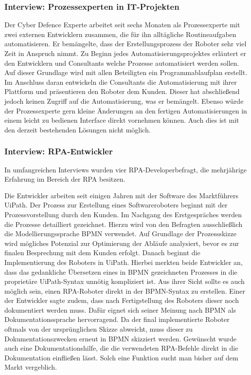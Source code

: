 \subsubsection{Interview: Prozessexperten in IT-Projekten}
Der Cyber Defence Experte arbeitet seit sechs Monaten als Prozessexperte mit zwei externen Entwicklern zusammen, die für ihn alltägliche Routineaufgaben automatisieren. Er bemängelte, dass der Erstellungsprozess der Roboter sehr viel Zeit in Anspruch nimmt. Zu Beginn jedes Automatisierungsprojektes erläutert er den Entwicklern und Consultants welche Prozesse automatisiert werden sollen. Auf dieser Grundlage wird mit allen Beteiligten ein Programmablaufplan erstellt. Im Anschluss daran entwickeln die Consultants die Automatisierung mit ihrer Plattform und präsentieren den Roboter dem Kunden. Dieser hat abschließend jedoch keinen Zugriff auf die Automatisierung, was er bemängelt. Ebenso würde der Prozessexperte gern kleine Änderungen an den fertigen Automatisierungen in einem leicht zu bedienen Interface direkt vornehmen können. Auch dies ist mit den derzeit bestehenden Lösungen nicht möglich.

\subsubsection{Interview: RPA-Entwickler}
In umfangreichen Interviews wurden vier RPA-Developerbefragt, die  mehrjährige Erfahrung im Bereich der RPA besitzen. 

Die Entwickler arbeiten seit einigen Jahren mit der Software des Marktführers UiPath. Der Prozess zur Erstellung eines Softwareroboters beginnt mit der Prozessvorstellung durch den Kunden. Im Nachgang des Erstgespräches werden die Prozesse detailliert gezeichnet. Hierzu wird von den Befragten ausschließlich die Modellierungssprache BPMN verwendet.  Auf Grundlage der Prozessskizze wird mögliches Potenzial zur Optimierung der Abläufe analysiert, bevor es zur finalen Besprechung mit dem Kunden erfolgt. Danach beginnt die Implementierung des Roboters in UiPath. Hierbei merkten beide Entwickler an, dass das gedankliche Übersetzen eines in BPMN gezeichneten Prozesses in die proprietäre UiPath-Syntax unnötig kompliziert ist. Aus ihrer Sicht sollte es auch möglich sein, einen RPA-Roboter direkt in der BPMN-Syntax zu erstellen. Einer der  Entwickler sagte zudem, dass nach Fertigstellung des Roboters dieser noch dokumentiert werden muss. Dafür eignet sich seiner Meinung nach BPMN als Dokumentationssprache hervorragend. Da der final implementierte Roboter oftmals von der ursprünglichen Skizze abweicht, muss dieser zu Dokumentationszwecken erneut in BPMN skizziert werden. Gewünscht wurde auch eine Dokumentationshilfe, die die verwendeten RPA-Befehle direkt in die Dokumentation einfließen lässt. Solch eine Funktion sucht man bisher auf dem Markt vergeblich. 

